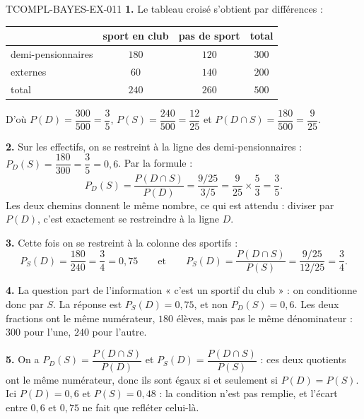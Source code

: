 \begin{corrige}{TCOMPL-BAYES-EX-011}
\textbf{1.} Le tableau croisé s'obtient par différences :

\begin{center}
\begin{tabular}{lccc}
\hline
 & sport en club & pas de sport & total \\
\hline
demi-pensionnaires & $180$ & $120$ & $300$ \\
externes & $60$ & $140$ & $200$ \\
\hline
total & $240$ & $260$ & $500$ \\
\hline
\end{tabular}
\end{center}

D'où $P(D)=\dfrac{300}{500}=\dfrac35$, $P(S)=\dfrac{240}{500}=\dfrac{12}{25}$ et
$P(D\cap S)=\dfrac{180}{500}=\dfrac{9}{25}$.

\textbf{2.} Sur les effectifs, on se restreint à la ligne des
demi-pensionnaires : $P_D(S)=\dfrac{180}{300}=\dfrac35=0{,}6$. Par la formule :
\[
  P_D(S)=\dfrac{P(D\cap S)}{P(D)}=\dfrac{9/25}{3/5}=\dfrac{9}{25}\times\dfrac53=\dfrac35.
\]
Les deux chemins donnent le même nombre, ce qui est attendu : diviser par
$P(D)$, c'est exactement se restreindre à la ligne $D$.

\textbf{3.} Cette fois on se restreint à la colonne des sportifs :
\[
  P_S(D)=\dfrac{180}{240}=\dfrac34=0{,}75
  \qquad\text{et}\qquad
  P_S(D)=\dfrac{P(D\cap S)}{P(S)}=\dfrac{9/25}{12/25}=\dfrac34.
\]

\textbf{4.} La question part de l'information « c'est un sportif du club » : on
conditionne donc par $S$. La réponse est $P_S(D)=0{,}75$, et non $P_D(S)=0{,}6$.
Les deux fractions ont le même numérateur, $180$ élèves, mais pas le même
dénominateur : $300$ pour l'une, $240$ pour l'autre.

\textbf{5.} On a $P_D(S)=\dfrac{P(D\cap S)}{P(D)}$ et
$P_S(D)=\dfrac{P(D\cap S)}{P(S)}$ : ces deux quotients ont le même numérateur,
donc ils sont égaux si et seulement si $P(D)=P(S)$. Ici $P(D)=0{,}6$ et
$P(S)=0{,}48$ : la condition n'est pas remplie, et l'écart entre $0{,}6$ et
$0{,}75$ ne fait que refléter celui-là.
\end{corrige}
